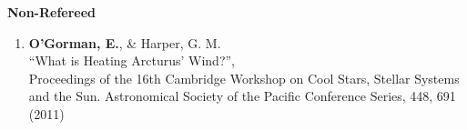 \begin{flushleft}
{\large \textbf{Non-Refereed}}
\end{flushleft}

\begin{enumerate}
\item \textbf{O'Gorman, E.}, \& Harper, G. M.\\
``What is Heating Arcturus' Wind?'', \\
Proceedings of the 16th Cambridge Workshop on Cool Stars, Stellar Systems and the Sun. 
Astronomical Society of the Pacific Conference Series, 448, 691 (2011)
\end{enumerate}

